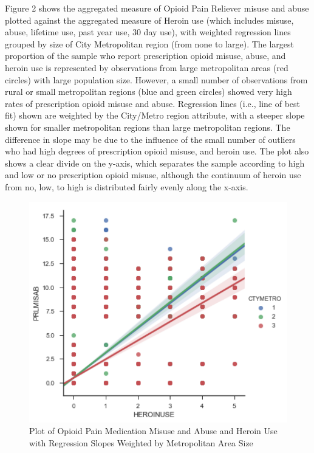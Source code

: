 \documentclass[sigconf]{acmart}
\begin{document}

Figure 2 shows the aggregated measure of Opioid Pain Reliever misuse and abuse 
plotted against the aggregated measure of Heroin use (which includes misuse, 
abuse, lifetime use, past year use, 30 day use), with weighted regression 
lines grouped by size of City Metropolitan region (from none to large). 
The largest proportion of the sample who report prescription opioid misuse, 
abuse, and heroin use is represented by observations from large metropolitan 
areas (red circles) with large population size. However, a small number of
observations from rural or small metropolitan regions (blue and green circles)
showed very high rates of prescription opioid misuse and abuse. Regression 
lines (i.e., line of best fit) shown are weighted by the City/Metro
region attribute, with a steeper slope shown for smaller metropolitan regions 
than large metropolitan regions. The difference in slope may be due to the 
influence of the small number of outliers who had high degrees of prescription 
opioid misuse, and heroin use. The plot also shows a clear divide on the y-axis,
which separates the sample according to high and low or no prescription opioid 
misuse, although the continuum of heroin use from no, low, to high is 
distributed fairly evenly along the x-axis. 


\begin{figure}[!ht]
  \centering\includegraphics[width=\columnwidth]{images/Figure2.pdf}
  \caption{Plot of Opioid Pain Medication Misuse and Abuse and Heroin Use
  with Regression Slopes Weighted by Metropolitan Area Size}
  \label{f:Figure2}
\end{figure}
\end{document}
